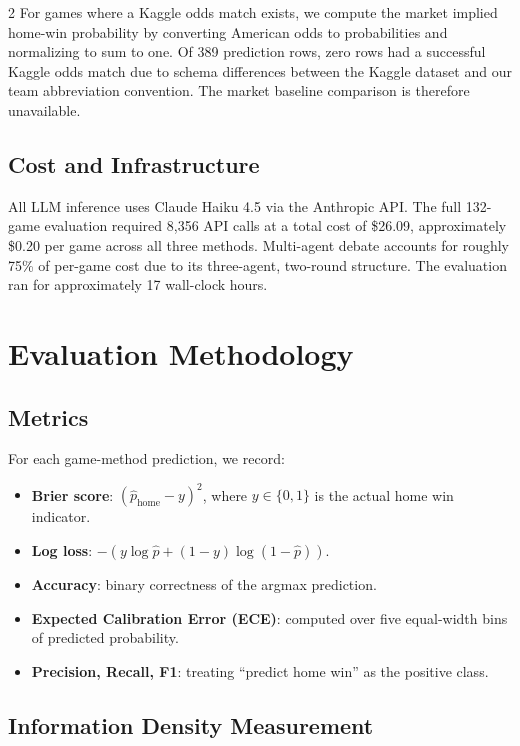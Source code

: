 \documentclass[11pt]{article}
\begin{document}
\begin{multicols}{2}
For games where a Kaggle odds match exists, we compute the market implied home-win probability by converting American odds to probabilities and normalizing to sum to one. Of 389 prediction rows, zero rows had a successful Kaggle odds match due to schema differences between the Kaggle dataset and our team abbreviation convention. The market baseline comparison is therefore unavailable.

\subsection{Cost and Infrastructure}

All LLM inference uses Claude Haiku 4.5 via the Anthropic API. The full 132-game evaluation required 8,356 API calls at a total cost of \$26.09, approximately \$0.20 per game across all three methods. Multi-agent debate accounts for roughly 75\% of per-game cost due to its three-agent, two-round structure. The evaluation ran for approximately 17 wall-clock hours.

\section{Evaluation Methodology}

\subsection{Metrics}

For each game-method prediction, we record:

\begin{itemize}[leftmargin=*]
    \item \textbf{Brier score}: $(\hat{p}_{\text{home}} - y)^2$, where $y \in \{0, 1\}$ is the actual home win indicator.
    \item \textbf{Log loss}: $-(y \log \hat{p} + (1-y) \log(1-\hat{p}))$.
    \item \textbf{Accuracy}: binary correctness of the argmax prediction.
    \item \textbf{Expected Calibration Error (ECE)}: computed over five equal-width bins of predicted probability.
    \item \textbf{Precision, Recall, F1}: treating ``predict home win'' as the positive class.
\end{itemize}

\subsection{Information Density Measurement}


\end{multicols}
\end{document}
